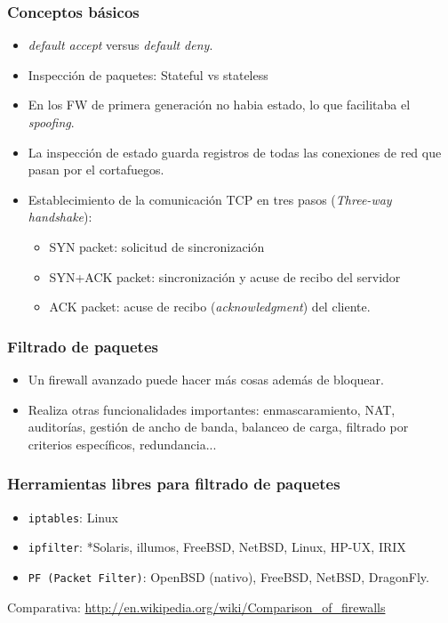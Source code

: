 \documentclass{beamer}
\begin{document}
\begin{frame}
\frametitle{Conceptos básicos}

\begin{itemize}
\item \textit{default accept} versus \textit{default deny}.
\item Inspección de paquetes: \alert{Stateful} vs \alert{stateless}  
\item En los FW de primera generación no habia estado, lo que facilitaba el \textit{spoofing}.
\item La inspección de estado guarda registros de todas las conexiones de red que pasan por el cortafuegos.
\item Establecimiento de la comunicación TCP en tres pasos (\textit{Three-way handshake}):

\begin{itemize}
	\item \alert{SYN packet}: solicitud de sincronización
	\item \alert{SYN+ACK packet}: sincronización y acuse de recibo del servidor
	\item \alert{ACK packet}: acuse de recibo (\textit{acknowledgment}) del cliente.
\end{itemize}

\end{itemize}

\end{frame}



\begin{frame}
\frametitle{Filtrado de paquetes}

\begin{itemize}
\item Un firewall avanzado puede hacer más cosas además de bloquear. 
\item Realiza otras funcionalidades importantes: enmascaramiento, NAT, auditorías, gestión de ancho de banda, balanceo de carga, filtrado por criterios específicos, redundancia...
\end{itemize}

\end{frame}


\begin{frame}
\frametitle{Herramientas libres para filtrado de paquetes}

\begin{itemize}
\item \alert{\texttt{iptables}}: Linux
\item \alert{\texttt{ipfilter}}: *Solaris, illumos, FreeBSD, NetBSD, Linux, HP-UX, IRIX
\item \alert{\texttt{PF (Packet Filter)}}: OpenBSD (nativo), FreeBSD, NetBSD, DragonFly.
\end{itemize}

Comparativa: \url{http://en.wikipedia.org/wiki/Comparison_of_firewalls}

\end{frame}
\end{document}
